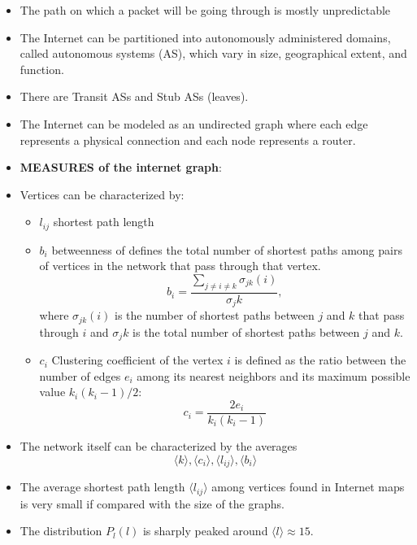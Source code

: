 \documentclass[11pt, a4paper]{article}
\begin{document}
\begin{itemize}
    \item The path on which a packet will be going through is mostly unpredictable
    \item The Internet can be partitioned into autonomously administered domains, called autonomous systems (AS), which vary in size, geographical extent, and function. 
    \item There are Transit ASs and Stub ASs (leaves).
    \item The Internet can be modeled as an undirected graph where each edge represents a physical connection and each node represents a router.
    \item \textbf{MEASURES of the internet graph}:
    \item Vertices can be characterized by:
    \begin{itemize}
        \item $l_{ij}$ shortest path length
        \item $b_i$ betweenness of defines the total number of shortest paths among pairs of vertices in the network that pass through that vertex.
        \begin{equation*}
            b_i = \frac{\sum\limits_{j\neq i \neq k} \sigma_{jk}(i)}{\sigma_jk},
        \end{equation*}
        where $\sigma_{jk}(i)$ is the number of shortest paths between $j$ and $k$ that pass through $i$ and $\sigma_jk$ is the total number of shortest paths between $j$ and $k$.
        \item $c_i$ Clustering coefficient of the vertex $i$ is defined as the ratio between the number of edges $e_i$ among its nearest neighbors and its maximum possible value $k_i (k_i-1)/2$:
        \begin{equation*}
            c_i = \frac{2e_i}{k_i(k_i-1)}
        \end{equation*}
    \end{itemize}
    \item The network itself can be characterized by the averages
    \begin{equation*}
        \langle k\rangle, \langle c_i\rangle, \langle l_{ij}\rangle, \langle b_i \rangle
    \end{equation*}
    \item The average shortest path length $\langle l_{ij}\rangle$ among vertices found in Internet maps is very small if compared with the size of the graphs.
    \item The distribution $P_l(l)$ is sharply peaked around $\langle l \rangle \approx 15$.

\end{itemize}
\end{document}
